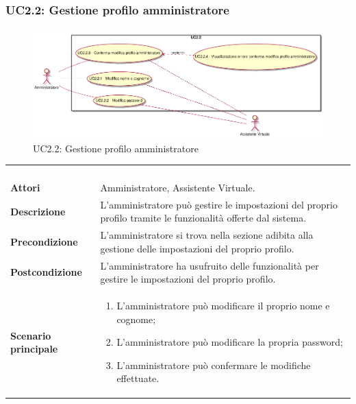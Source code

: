 \newpage\subsubsection{UC2.2: Gestione profilo amministratore}
\label{UC2.2}
\begin{figure}[h]
\centering
\includegraphics[width=\textwidth,height=\textheight,keepaspectratio]{images/UseCaseUC22.png}
\caption{UC2.2: Gestione profilo amministratore}
\end{figure}
\begin{longtable}{l|p{10cm}}
\rowcolor[gray]{0.8} \multicolumn{2}{c}{} \\
\rowcolor[gray]{0.8} \multicolumn{2}{c}{\textbf{UC2.2 - Gestione profilo amministratore}} \\
\rowcolor[gray]{0.8} \multicolumn{2}{c}{} \\
\hline
&\\
\textbf{Attori} & Amministratore, Assistente Virtuale.\\[7pt]
\textbf{Descrizione} & L'amministratore può gestire le impostazioni del proprio profilo tramite le funzionalità  offerte dal sistema.\\[7pt]
\textbf{Precondizione} & L'amministratore si trova nella sezione adibita alla gestione delle impostazioni del proprio profilo.\\[7pt]
\textbf{Postcondizione} & L'amministratore ha usufruito delle funzionalità per gestire le impostazioni del proprio profilo.\\[7pt]
\textbf{Scenario principale} &\begin{enumerate}
\item  L'amministratore può modificare il proprio nome e cognome;
\item  L'amministratore può modificare la propria password;
\item  L'amministratore può confermare le modifiche effettuate.
\end{enumerate}
\\[7pt]\hline
\end{longtable}


